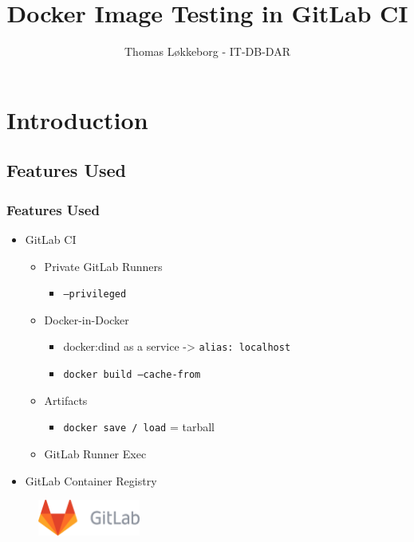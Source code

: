 \documentclass[14pt,aspectratio=169]{beamer}
\title[]{Docker Image Testing in GitLab CI}
\author[Author]{Thomas Løkkeborg - IT-DB-DAR}
\begin{document}
\cernSplashBlue

{
  \frame{\titlepage}
}
\setcounter{framenumber}{0}



\section{Introduction}

\subsection{Features Used}

\begin{frame}
  \frametitle{Features Used}
    \begin{itemize}
      \item GitLab CI
      \begin{itemize}
        \item Private GitLab Runners
        \begin{itemize}
          \item \texttt{--privileged}
        \end{itemize}
        \item Docker-in-Docker
        \begin{itemize}
          \item docker:dind as a service -> \texttt{alias: localhost}
          \item \texttt{docker build --cache-from}
        \end{itemize}
        \item Artifacts
        \begin{itemize}
          \item \texttt{docker save / load} = tarball
        \end{itemize}
        \item GitLab Runner Exec
      \end{itemize}
      \item GitLab Container Registry
    \end{itemize}
  \begin{figure}
    \includegraphics[width=0.3\textwidth]{images/gitlab.png}
  \end{figure}
\end{frame}
\end{document}
